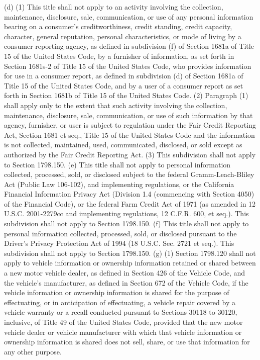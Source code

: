 (d) (1) This title shall not apply to an activity involving the collection, maintenance, disclosure, sale, communication, or use of any personal information bearing on a consumer’s creditworthiness, credit standing, credit capacity, character, general reputation, personal characteristics, or mode of living by a consumer reporting agency, as defined in subdivision (f) of Section 1681a of Title 15 of the United States Code, by a furnisher of information, as set forth in Section 1681s-2 of Title 15 of the United States Code, who provides information for use in a consumer report, as defined in subdivision (d) of Section 1681a of Title 15 of the United States Code, and by a user of a consumer report as set forth in Section 1681b of Title 15 of the United States Code.
(2) Paragraph (1) shall apply only to the extent that such activity involving the collection, maintenance, disclosure, sale, communication, or use of such information by that agency, furnisher, or user is subject to regulation under the Fair Credit Reporting Act, Section 1681 et seq., Title 15 of the United States Code and the information is not collected, maintained, used, communicated, disclosed, or sold except as authorized by the Fair Credit Reporting Act.
(3) This subdivision shall not apply to Section 1798.150.
(e) This title shall not apply to personal information collected, processed, sold, or disclosed subject to the federal Gramm-Leach-Bliley Act (Public Law 106-102), and implementing regulations, or the California Financial Information Privacy Act (Division 1.4 (commencing with Section 4050) of the Financial Code), or the federal Farm Credit Act of 1971 (as amended in 12 U.S.C. 2001-2279cc and implementing regulations, 12 C.F.R. 600, et seq.). This subdivision shall not apply to Section 1798.150.
(f) This title shall not apply to personal information collected, processed, sold, or disclosed pursuant to the Driver’s Privacy Protection Act of 1994 (18 U.S.C. Sec. 2721 et seq.). This subdivision shall not apply to Section 1798.150.
(g) (1) Section 1798.120 shall not apply to vehicle information or ownership information retained or shared between a new motor vehicle dealer, as defined in Section 426 of the Vehicle Code, and the vehicle’s manufacturer, as defined in Section 672 of the Vehicle Code, if the vehicle information or ownership information is shared for the purpose of effectuating, or in anticipation of effectuating, a vehicle repair covered by a vehicle warranty or a recall conducted pursuant to Sections 30118 to 30120, inclusive, of Title 49 of the United States Code, provided that the new motor vehicle dealer or vehicle manufacturer with which that vehicle information or ownership information is shared does not sell, share, or use that information for any other purpose.
